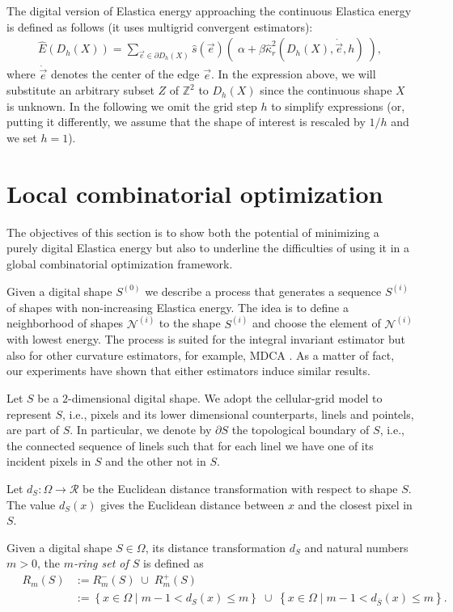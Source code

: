 \documentclass[smallextended]{svjour3}       %
\begin{document}
The digital version of Elastica energy approaching the continuous Elastica energy is defined as follows (it uses multigrid convergent estimators):
\begin{align}
	\hat{E}( D_h(X) ) = \sum_{\vec{e} \in \partial D_h(X)}{ \hat{s}(\vec{e})\left(\; \alpha + \beta \hat{\kappa}_{r}^2(D_h(X),\dot{\vec{e}},h) \; \right)},
	\label{eq:digital-energy}
\end{align}
where $\dot{\vec{e}}$ denotes the center of the edge $\vec{e}$. In the
expression above, we will substitute an arbitrary subset $Z$ of
$\mathbb{Z}^2$ to $D_h(X)$ since the continuous shape $X$ is unknown.
In the following we omit the grid step $h$ to simplify expressions
(or, putting it differently, we assume that the shape of interest is
rescaled by $1/h$ and we set $h=1$).

\section{Local combinatorial optimization}

The objectives of this section is to show both the potential of minimizing a purely digital Elastica energy but also to underline the difficulties of using it in a global combinatorial optimization framework.

Given a digital shape $S^{(0)}$ we describe a process that generates a
sequence $S^{(i)}$ of shapes with non-increasing Elastica energy. The
idea is to define a neighborhood of shapes $\mathcal{N}^{(i)}$ to the
shape $S^{(i)}$ and choose the element of $\mathcal{N}^{(i)}$ with
lowest energy.  The process is suited for the integral invariant
estimator but also for other curvature estimators, for example, MDCA
\cite{roussillon11mdca}. As a matter of fact, our experiments have
shown that either estimators induce similar results.

Let $S$ be a $2$-dimensional digital shape. We adopt the cellular-grid model to represent $S$, i.e., pixels and its lower dimensional counterparts, linels and pointels, are part of $S$. In particular, we denote by $\partial S$ the topological boundary of $S$, i.e., the connected sequence of linels such that for each linel we have one of its incident pixels in $S$ and the other not in $S$.


Let $d_{S}:\Omega \rightarrow \mathcal{R}$ be the Euclidean distance transformation with respect to shape $S$. The value $d_S(x)$ gives the Euclidean distance between $x$ and the closest pixel in $S$. 

\begin{definition}
Given a digital shape $S\in\Omega$, its distance transformation $d_S$ and natural numbers $m > 0$, the {\em $m$-ring set of $S$} is defined as
\begin{align*}
	\quad R_m(S) &:= R_m^-(S) \; \cup \; R_m^+(S) \\
	&:= \left\{ x \in \Omega \; | \; m-1 < d_S(x) \leq m \right\} \; \cup \;  \left\{ x \in \Omega \; | \; 	m-1 < d_{\overline{S}}(x) \leq m \right\}.
\end{align*}
\end{definition}
\end{document}
